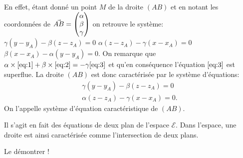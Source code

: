 \documentclass[letterpaper,10pt,english]{jupyterBook}
\begin{document}
\sphinxAtStartPar
En effet, étant donné un point \(M\) de la droite \((AB)\) et en notant les coordonnées de \(\vec{AB} = \begin{pmatrix}\alpha\cr \beta \cr \gamma \end{pmatrix}\) on retrouve le système:
\(
\gamma(y-y_A) - \beta(z-z_A) = 0 \label{eq:1} \tag{1} 
\)
\(
\alpha(z-z_A)-\gamma(x-x_A)=0 \label{eq:2} \tag{2}
\)
\(
\beta(x-x_A) - \alpha (y-y_A)=0 \label{eq:3} \tag{3}.
\)
On remarque que \(\alpha \times \eqref{eq:1} + \beta \times \eqref{eq:2}  =-\gamma \eqref{eq:3}\) et qu’en conséquence l’équation \(\eqref{eq:3}\) est superflue. La droite \((AB)\) est donc caractérisée par le système d’équations:
\begin{equation*}
\begin{split}
\gamma(y-y_A) - \beta(z-z_A) = 0\\
\alpha(z-z_A)-\gamma(x-x_A)=0.
\end{split}
\end{equation*}
\sphinxAtStartPar
On l’appelle système d’équation caractéristique de \((AB)\).

\sphinxAtStartPar
{} Il s’agit en fait des équations de deux plan de l’espace \(\mathcal{E}\). Dans l’espace, une droite est ainsi caractérisée comme l’intersection de deux plans.

\sphinxAtStartPar
{} Le démontrer !







\renewcommand{\indexname}{Index}
\printindex
\end{document}
